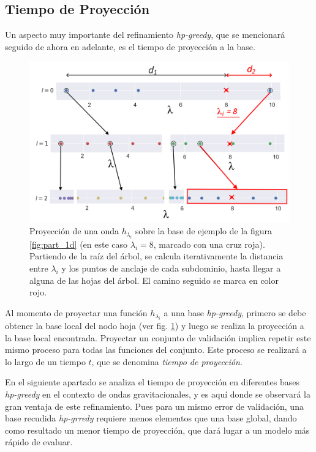 \subsection{Tiempo de Proyección}


Un aspecto muy importante del refinamiento \textit{hp-greedy}, que se mencionará seguido de ahora en adelante, es el tiempo de proyección a la base. 


\begin{figure}[h!]
\centering
\includegraphics[width=0.75\columnwidth]{figs/proyeccion_1d.png}
\caption{Proyección de una onda $h_{\lambda_i}$ sobre la base de ejemplo de la figura \ref{fig:part_1d} (en este caso $\lambda_i = 8$, marcado con una cruz roja). Partiendo de la raíz del árbol, se calcula iterativamente la distancia entre $\lambda_i$ y los puntos de anclaje de cada subdominio, hasta llegar a alguna de las hojas del árbol. El camino seguido se marca en color rojo.}
\label{fig:proy_1d}
\end{figure}

Al momento de proyectar una función $h_{\lambda_i}$ a una base \textit{hp-greedy}, primero se debe obtener la base local del nodo hoja (ver fig. \ref{fig:proy_1d}) y luego se realiza la proyección a la base local encontrada.
Proyectar un conjunto de validación implica repetir este mismo proceso para todas las funciones del conjunto. Este proceso se realizará a lo largo de un tiempo $t$, que se denomina \textit{tiempo de proyección}. 


En el siguiente apartado se analiza el tiempo de proyección en diferentes bases \textit{hp-greedy} en el contexto de ondas gravitacionales, y es aquí donde se observará la gran ventaja de este refinamiento. Pues para un mismo error de validación, una base recudida \textit{hp-grredy} requiere menos elementos que una base global, dando como resultado un menor tiempo de proyección, que dará lugar a un modelo más rápido de evaluar.


